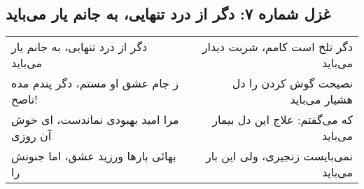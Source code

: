 \begin{center}
\section*{غزل شماره ۷: دگر از درد تنهایی، به جانم یار می‌باید}
\label{sec:007}
\begin{longtable}{l p{0.5cm} r}
دگر از درد تنهایی، به جانم یار می‌باید
&&
دگر تلخ است کامم، شربت دیدار می‌باید
\\
ز جام عشق او مستم، دگر پندم مده ناصح!
&&
نصیحت گوش کردن را دل هشیار می‌باید
\\
مرا امید بهبودی نماندست، ای خوش آن روزی
&&
که می‌گفتم: علاج این دل بیمار می‌باید
\\
بهائی بارها ورزید عشق، اما جنونش را
&&
نمی‌بایست زنجیری، ولی این بار می‌باید
\\
\end{longtable}
\end{center}
